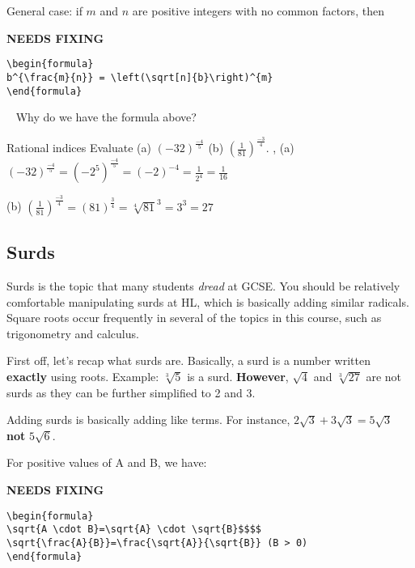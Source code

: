 General case: if $m$ and $n$ are positive integers with no common factors, then

{\hfill\Large\bfseries NEEDS FIXING\hfill}
\begin{lstlisting}
\begin{formula}
b^{\frac{m}{n}} = \left(\sqrt[n]{b}\right)^{m}
\end{formula}
 \end{lstlisting}
\begin{thinking}{~}
Why do we have the formula above?
\end{thinking}

\begin{example}{Rational indices}
Evaluate (a) $(-32)^{\frac{-4}{5}}$ \hspace{1cm} (b) $\left(\frac{1}{81}\right)^{\frac{-3}{4}}$.
\sep
(a) $(-32)^{\frac{-4}{5}}=\left(-2^{5}\right)^{\frac{-4}{5}}=(-2)^{-4}=\frac{1}{2^{4}}=\frac{1}{16}$

(b) $\left(\frac{1}{81}\right)^{\frac{-3}{4}}=(81)^{\frac{3}{4}}=\sqrt[4]{81}^{3}=3^{3}=27$
\end{example}

\subsection{Surds}
Surds is the topic that many students \textit{dread} at GCSE.
You should be relatively comfortable manipulating surds at HL, which is basically adding similar radicals. Square roots occur frequently in several of the topics in this course, such as trigonometry and calculus.

First off, let's recap what surds are. Basically, a surd is a number written \textbf{exactly} using roots. Example: $\sqrt[3]{5}$ is a surd.
\textbf{However}, $\sqrt{4}$ and $\sqrt[3]{27}$ are not surds as they can be further simplified to 2 and 3.

Adding surds is basically adding like terms. For instance, $2\sqrt{3}+3\sqrt{3}=5\sqrt{3}$ \textbf{not} $5\sqrt{6}$. %

For positive values of A and B, we have:

{\hfill\Large\bfseries NEEDS FIXING\hfill}
\begin{lstlisting}
\begin{formula}
\sqrt{A \cdot B}=\sqrt{A} \cdot \sqrt{B}$$$$
\sqrt{\frac{A}{B}}=\frac{\sqrt{A}}{\sqrt{B}} (B > 0)
\end{formula}
 \end{lstlisting}


